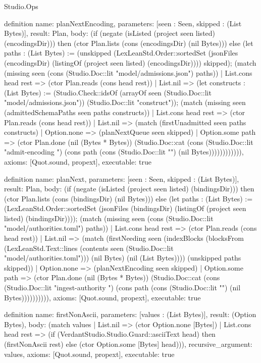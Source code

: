 \begin{lexlean}{Studio.Ops}
\begin{semanticmodule}
{definition{
  name: planNextEncoding,
  parameters: [seen : Seen, skipped : (List Bytes)],
  result: Plan,
  body: (if (negate (isListed (project seen listed) (encodingsDir))) then (ctor Plan.lists (cons (encodingsDir) (nil Bytes))) else (let paths : (List Bytes) := (unskipped (LexLeanStd.Order::sortedSet (jsonFiles (encodingsDir) (listingOf (project seen listed) (encodingsDir)))) skipped); (match (missing seen (cons (Studio.Doc::lit "model/admissions.json") paths))
    | List.cons head rest => (ctor Plan.reads (cons head rest))
    | List.nil => (let constructs : (List Bytes) := (Studio.Check::idsOf (arrayOf seen (Studio.Doc::lit "model/admissions.json")) (Studio.Doc::lit "construct")); (match (missing seen (admittedSchemaPaths seen paths constructs))
    | List.cons head rest => (ctor Plan.reads (cons head rest))
    | List.nil => (match (firstUnadmitted seen paths constructs)
      | Option.none => (planNextQueue seen skipped)
      | Option.some path => (ctor Plan.done (nil (Bytes * Bytes)) (Studio.Doc::cat (cons (Studio.Doc::lit "admit-encoding ") (cons path (cons (Studio.Doc::lit "\n") (nil Bytes)))))))))))),
  axioms: [Quot.sound, propext],
  executable: true
}

definition{
  name: planNext,
  parameters: [seen : Seen, skipped : (List Bytes)],
  result: Plan,
  body: (if (negate (isListed (project seen listed) (bindingsDir))) then (ctor Plan.lists (cons (bindingsDir) (nil Bytes))) else (let paths : (List Bytes) := (LexLeanStd.Order::sortedSet (jsonFiles (bindingsDir) (listingOf (project seen listed) (bindingsDir)))); (match (missing seen (cons (Studio.Doc::lit "model/authorities.toml") paths))
    | List.cons head rest => (ctor Plan.reads (cons head rest))
    | List.nil => (match (firstNeeding seen (indexBlocks (blocksFrom (LexLeanStd.Text::lines (contents seen (Studio.Doc::lit "model/authorities.toml"))) (nil Bytes) (nil (List Bytes)))) (unskipped paths skipped))
      | Option.none => (planNextEncoding seen skipped)
      | Option.some path => (ctor Plan.done (nil (Bytes * Bytes)) (Studio.Doc::cat (cons (Studio.Doc::lit "ingest-authority ") (cons path (cons (Studio.Doc::lit "\n") (nil Bytes)))))))))),
  axioms: [Quot.sound, propext],
  executable: true
}

definition{
  name: firstNonAscii,
  parameters: [values : (List Bytes)],
  result: (Option Bytes),
  body: (match values
    | List.nil => (ctor Option.none [Bytes])
    | List.cons head rest => (if (VerdantStudio.Studio.Guard::asciiText head) then (firstNonAscii rest) else (ctor Option.some [Bytes] head))),
  recursive_argument: values,
  axioms: [Quot.sound, propext],
  executable: true
}

}
\end{semanticmodule}
\end{lexlean}
